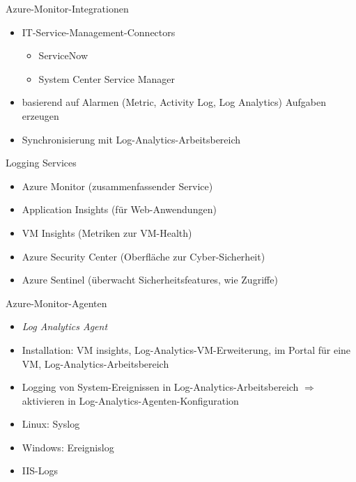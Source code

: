 \begin{flashcard}[Definition]{Azure-Monitor-Integrationen}
  \begin{itemize}
    \item IT-Service-Management-Connectors
      \begin{itemize}
        \item ServiceNow
        \item System Center Service Manager
      \end{itemize}
    \item basierend auf Alarmen (Metric, Activity Log, Log Analytics) Aufgaben erzeugen
    \item Synchronisierung mit Log-Analytics-Arbeitsbereich
  \end{itemize}
\end{flashcard}


\begin{flashcard}[Definition]{Logging Services}
  \begin{itemize}
    \item Azure Monitor (zusammenfassender Service)
    \item Application Insights (für Web-Anwendungen)
    \item VM Insights (Metriken zur VM-Health)
    \item Azure Security Center (Oberfläche zur Cyber-Sicherheit)
    \item Azure Sentinel (überwacht Sicherheitsfeatures, wie Zugriffe)
  \end{itemize}
\end{flashcard}

\begin{flashcard}[Definition]{Azure-Monitor-Agenten}
  \begin{itemize}
    \item \emph{Log Analytics Agent}
    \item Installation: VM insights, Log-Analytics-VM-Erweiterung, im Portal für eine VM, Log-Analytics-Arbeitsbereich
    \item Logging von System-Ereignissen in Log-Analytics-Arbeitsbereich\newline
      $\Rightarrow$ aktivieren in Log-Analytics-Agenten-Konfiguration
    \item Linux: Syslog
    \item Windows: Ereignislog
    \item IIS-Logs
  \end{itemize}
\end{flashcard}

